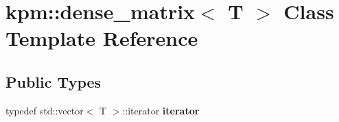 \hypertarget{classkpm_1_1dense__matrix}{}\section{kpm\+:\+:dense\+\_\+matrix$<$ T $>$ Class Template Reference}
\label{classkpm_1_1dense__matrix}
\subsection*{Public Types}
\begin{DoxyCompactItemize}
\item 
typedef std\+::vector$<$ T $>$\+::iterator {\bfseries iterator}\hypertarget{classkpm_1_1dense__matrix_ab381f4898ec8bb065c246b4e4755442a}{}\label{classkpm_1_1dense__matrix_ab381f4898ec8bb065c246b4e4755442a}

\end{DoxyCompactItemize}
